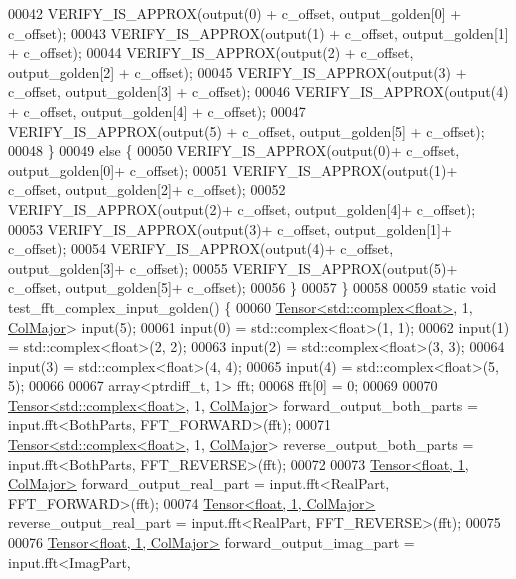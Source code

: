 \begin{DoxyCode}
00042     VERIFY\_IS\_APPROX(output(0) + c\_offset, output\_golden[0] + c\_offset);
00043     VERIFY\_IS\_APPROX(output(1) + c\_offset, output\_golden[1] + c\_offset);
00044     VERIFY\_IS\_APPROX(output(2) + c\_offset, output\_golden[2] + c\_offset);
00045     VERIFY\_IS\_APPROX(output(3) + c\_offset, output\_golden[3] + c\_offset);
00046     VERIFY\_IS\_APPROX(output(4) + c\_offset, output\_golden[4] + c\_offset);
00047     VERIFY\_IS\_APPROX(output(5) + c\_offset, output\_golden[5] + c\_offset);
00048   \}
00049   \textcolor{keywordflow}{else} \{
00050     VERIFY\_IS\_APPROX(output(0)+ c\_offset, output\_golden[0]+ c\_offset);
00051     VERIFY\_IS\_APPROX(output(1)+ c\_offset, output\_golden[2]+ c\_offset);
00052     VERIFY\_IS\_APPROX(output(2)+ c\_offset, output\_golden[4]+ c\_offset);
00053     VERIFY\_IS\_APPROX(output(3)+ c\_offset, output\_golden[1]+ c\_offset);
00054     VERIFY\_IS\_APPROX(output(4)+ c\_offset, output\_golden[3]+ c\_offset);
00055     VERIFY\_IS\_APPROX(output(5)+ c\_offset, output\_golden[5]+ c\_offset);
00056   \}
00057 \}
00058 
00059 \textcolor{keyword}{static} \textcolor{keywordtype}{void} test\_fft\_complex\_input\_golden() \{
00060   \hyperlink{class_eigen_1_1_tensor}{Tensor<std::complex<float>}, 1, \hyperlink{group__enums_ggaacded1a18ae58b0f554751f6cdf9eb13a0cbd4bdd0abcfc0224c5fcb5e4f6669a}{ColMajor}> input(5);
00061   input(0) = std::complex<float>(1, 1);
00062   input(1) = std::complex<float>(2, 2);
00063   input(2) = std::complex<float>(3, 3);
00064   input(3) = std::complex<float>(4, 4);
00065   input(4) = std::complex<float>(5, 5);
00066 
00067   array<ptrdiff\_t, 1> fft;
00068   fft[0] = 0;
00069 
00070   \hyperlink{class_eigen_1_1_tensor}{Tensor<std::complex<float>}, 1, \hyperlink{group__enums_ggaacded1a18ae58b0f554751f6cdf9eb13a0cbd4bdd0abcfc0224c5fcb5e4f6669a}{ColMajor}> forward\_output\_both\_parts = 
      input.fft<BothParts, FFT\_FORWARD>(fft);
00071   \hyperlink{class_eigen_1_1_tensor}{Tensor<std::complex<float>}, 1, \hyperlink{group__enums_ggaacded1a18ae58b0f554751f6cdf9eb13a0cbd4bdd0abcfc0224c5fcb5e4f6669a}{ColMajor}> reverse\_output\_both\_parts = 
      input.fft<BothParts, FFT\_REVERSE>(fft);
00072 
00073   \hyperlink{class_eigen_1_1_tensor}{Tensor<float, 1, ColMajor>} forward\_output\_real\_part = input.fft<RealPart, 
      FFT\_FORWARD>(fft);
00074   \hyperlink{class_eigen_1_1_tensor}{Tensor<float, 1, ColMajor>} reverse\_output\_real\_part = input.fft<RealPart, 
      FFT\_REVERSE>(fft);
00075 
00076   \hyperlink{class_eigen_1_1_tensor}{Tensor<float, 1, ColMajor>} forward\_output\_imag\_part = input.fft<ImagPart, 

\end{DoxyCode}
